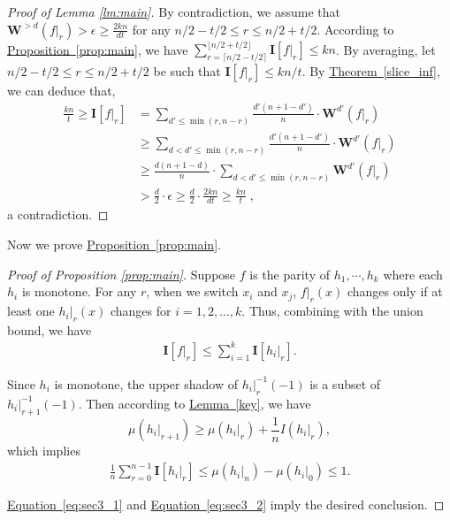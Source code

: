 \documentclass[11pt]{article}
\numberwithin{equation}{section}
\theoremstyle{definition}
\theoremstyle{plain}
\newcommand{\expref}[2]{\hyperref[#2]{#1~\ref{#2}}}
\newcommand{\expeqref}[2]{\hyperref[#2]{#1~\eqref{#2}}}
\newcommand{\W}{\mathbf{W}}
\newcommand{\I}{\mathbf{I}}
\newcommand{\floor}[1]{\lfloor#1\rfloor}
\newcommand{\warn}[1]{#1}
\begin{document}
\begin{proof}[Proof of Lemma \ref{lm:main}]
By contradiction, we assume that $\W^{>d}(f|_r)>\epsilon\geq \frac{2kn}{dt}$ for any $n/2-t/2\leq r\leq n/2+t/2$.
  According to \expref{Proposition}{prop:main},  we have $\sum_{r=\lceil n/2-t/2\rceil}^{\floor{n/2+t/2}} \I[f|_r]\leq kn$. By averaging, let $n/2 - t/2\leq r\leq n/2 + t/2$ be such that
  $\I[f|_r] \le kn/t$.
  By \expref{Theorem}{slice_inf}, we can deduce that,
  \begin{align} %
    \frac{kn}{t} \ge \I[f|_r] & =\sum_{d' \le \min(r,n-r)}\frac{d'(n+1-d')}{n} \cdot \W^{d'}(f|_r)\\
     & \ge \sum_{d < d' \le \min(r,n-r)}\frac{d'(n+1-d')}{n}\cdot \W^{d'}(f|_r) \\
     & \ge \frac{d(n+1-d)}{n} \cdot \sum_{d < d' \le \min(r, n-r)}\W^{d'}(f|_r) \\
     & > \frac{d}{2} \cdot \epsilon\geq \frac{d}{2} \cdot \frac{2kn}{dt}\geq \frac{kn}{t} \; ,
  \end{align} %
a contradiction.
\end{proof}

Now we prove \expref{Proposition}{prop:main}.

\begin{proof}[Proof of Proposition \ref{prop:main}]
    Suppose $f$ is the parity of $h_1,\cdots,h_k$ where each $h_i$ is monotone.
    For any $r$, when we switch $x_i$ and $x_j$, $f|_r(x)$ changes only if at least one $h_i|_r(x)$ changes for $i=1,2,\dots, k$. Thus, combining with the union bound, we have
    \begin{align}\label{eq:sec3_1}
    \I[f|_r]\leq \sum_{i=1}^k\I[h_i|_r].
    \end{align}
    
    \warn{Since $h_i$ is monotone, the upper shadow of $h_i|^{-1}_r(-1)$ is a subset of $h_i|^{-1}_{r+1}(-1)$. Then according to \expref{Lemma}{key}, we have
\begin{equation} %
    \mu(h_i|_{r+1})\geq \mu(h_i|_r)+\frac{1}{n}I(h_i|_r),
\end{equation} %
    which implies 
    \begin{align}\label{eq:sec3_2}
    \frac{1}{n}\sum_{r=0}^{n-1} \I[h_i|_r]\leq \mu(h_i|_{n})-\mu(h_i|_{0})\leq 1.
    \end{align}
    
    \expeqref{Equation}{eq:sec3_1} and \expeqref{Equation}{eq:sec3_2} imply the desired conclusion.}
\end{proof}
 
\end{document}
